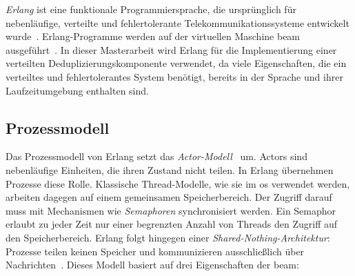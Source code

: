 \textit{Erlang} ist eine funktionale Programmiersprache, die ursprünglich für ne\-ben\-läu\-fi\-ge, verteilte und fehlertolerante Telekommunikationssysteme entwickelt wurde~\citep{armstrong2003making, virding1996concurrent}. Erlang-Programme werden auf der virtuellen Maschine \gls{beam} ausgeführt~\citep{stenman2015erlang, beam_vm}. In dieser Masterarbeit wird Erlang für die Implementierung einer verteilten Deduplizierungskomponente verwendet, da viele Eigenschaften, die ein verteiltes und fehlertolerantes System benötigt, bereits in der Sprache und ihrer Laufzeitumgebung enthalten sind.

\newpage

\subsection{Prozessmodell}
\label{sub:grundlagen-erlang-prozessmodell}

Das Prozessmodell von Erlang setzt das \textit{Actor-Modell}~\citep{agha1986actors} um. Actors sind nebenläufige Einheiten, die ihren Zustand nicht teilen. In Erlang übernehmen Prozesse diese Rolle. Klassische Thread-Modelle, wie sie im \gls{os} verwendet werden, arbeiten dagegen auf einem gemeinsamen Speicherbereich. Der Zugriff darauf muss mit Mechanismen wie \textit{Semaphoren} synchronisiert werden. Ein Semaphor erlaubt zu jeder Zeit nur einer begrenzten Anzahl von Threads den Zugriff auf den Speicherbereich. Erlang folgt hingegen einer \textit{Shared-Nothing-Architektur}: Prozesse teilen keinen Speicher und kommunizieren ausschließlich über Nachrichten~\citep{armstrong2003making}. Dieses Modell basiert auf drei Eigenschaften der \gls{beam}:

